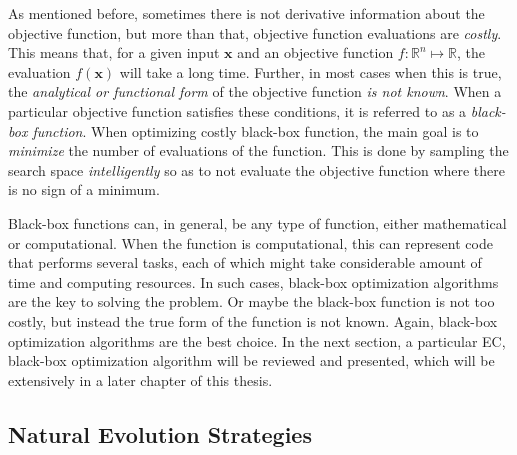 As mentioned before, sometimes there is not derivative information about the objective 
function, but more than that, objective function evaluations are \emph{costly}. This means 
that, for a given input \(\mathbf{x}\) and an objective function \(f \colon \mathbb{R}^n \mapsto \mathbb{R}\), the evaluation \(f(\mathbf{x})\) will take a long time. Further, in 
most cases when this is true, the \emph{analytical or functional form} of the objective 
function \emph{is not known}. When a particular objective function satisfies these 
conditions, it is referred to as a \emph{black-box function}. When optimizing costly 
black-box function, the main goal is to \emph{minimize} the number of evaluations of the 
function. This is done by sampling the search space \emph{intelligently} so as to not 
evaluate the objective function where there is no sign of a minimum.

Black-box functions can, in general, be any type of function, either mathematical or 
computational. When the function is computational, this can represent code that performs 
several tasks, each of which might take considerable amount of time and computing 
resources. In such cases, black-box optimization algorithms are the key to solving the 
problem. Or maybe the black-box function is not too costly, but instead the true form of 
the function is not known. Again, black-box optimization algorithms are the best choice. In 
the next section, a particular EC, black-box optimization algorithm will be reviewed and 
presented, which will be extensively in a later chapter of this thesis.

\subsection{Natural Evolution Strategies}